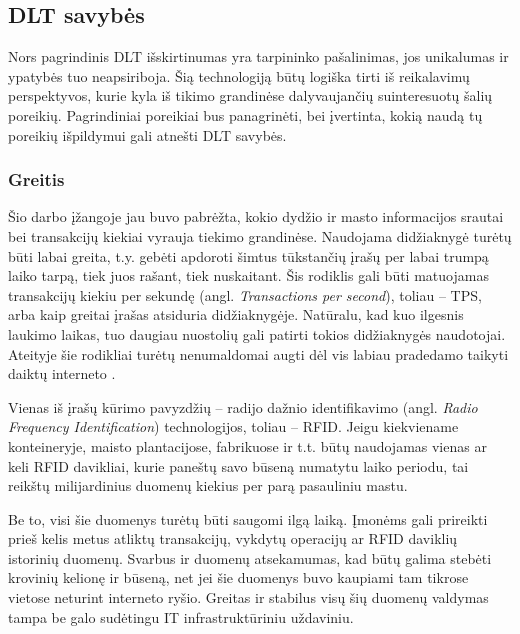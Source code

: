 
\subsection{DLT savybės}

Nors pagrindinis DLT išskirtinumas yra tarpininko pašalinimas, jos unikalumas ir ypatybės tuo neapsiriboja. Šią technologiją būtų logiška tirti iš reikalavimų perspektyvos, kurie kyla iš tikimo grandinėse dalyvaujančių suinteresuotų šalių poreikių. Pagrindiniai poreikiai bus panagrinėti, bei įvertinta, kokią naudą tų poreikių išpildymui gali atnešti DLT savybės.




\subsubsection{Greitis}

Šio darbo įžangoje jau buvo pabrėžta, kokio dydžio ir masto informacijos srautai bei transakcijų kiekiai vyrauja tiekimo grandinėse. Naudojama didžiaknygė turėtų būti labai greita, t.y. gebėti apdoroti šimtus tūkstančių įrašų per labai trumpą laiko tarpą, tiek juos rašant, tiek nuskaitant. Šis rodiklis gali būti matuojamas transakcijų kiekiu per sekundę (angl. \textit{Transactions per second}), toliau – TPS, arba kaip greitai įrašas atsiduria didžiaknygėje. Natūralu, kad kuo ilgesnis laukimo laikas, tuo daugiau nuostolių gali patirti tokios didžiaknygės naudotojai. Ateityje šie rodikliai turėtų nenumaldomai augti dėl vis labiau pradedamo taikyti daiktų interneto \cite{kaur2018edge}. 

Vienas iš įrašų kūrimo pavyzdžių – radijo dažnio identifikavimo (angl. \textit{Radio Frequency Identification}) technologijos, toliau – RFID. Jeigu kiekviename konteineryje, maisto plantacijose, fabrikuose ir t.t. būtų naudojamas vienas ar keli RFID davikliai, kurie paneštų savo būseną numatytu laiko periodu, tai reikštų milijardinius duomenų kiekius per parą pasauliniu mastu.

Be to, visi šie duomenys turėtų būti saugomi ilgą laiką. Įmonėms gali prireikti prieš kelis metus atliktų transakcijų, vykdytų operacijų ar RFID daviklių istorinių duomenų. Svarbus ir duomenų atsekamumas, kad būtų galima stebėti krovinių kelionę ir būseną, net jei šie duomenys buvo kaupiami tam tikrose vietose neturint interneto ryšio. Greitas ir stabilus visų šių duomenų valdymas tampa be galo sudėtingu IT infrastruktūriniu uždaviniu.

